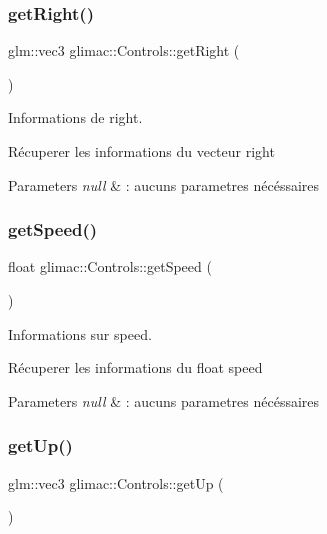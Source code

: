 \subsubsection{\texorpdfstring{get\+Right()}{getRight()}}
{\footnotesize\ttfamily glm\+::vec3 glimac\+::\+Controls\+::get\+Right (\begin{DoxyParamCaption}{ }\end{DoxyParamCaption})}



Informations de right. 

Récuperer les informations du vecteur right


\begin{DoxyParams}{Parameters}
{\em null} & \+: aucuns parametres nécéssaires \\
\hline
\end{DoxyParams}
\mbox{\label{classglimac_1_1Controls_aac3ad087d701019eede9beb547fe7425}} 
\subsubsection{\texorpdfstring{get\+Speed()}{getSpeed()}}
{\footnotesize\ttfamily float glimac\+::\+Controls\+::get\+Speed (\begin{DoxyParamCaption}{ }\end{DoxyParamCaption})}



Informations sur speed. 

Récuperer les informations du float speed


\begin{DoxyParams}{Parameters}
{\em null} & \+: aucuns parametres nécéssaires \\
\hline
\end{DoxyParams}
\mbox{\label{classglimac_1_1Controls_a6d030431b293ace529d7696c2444fd68}} 
\subsubsection{\texorpdfstring{get\+Up()}{getUp()}}
{\footnotesize\ttfamily glm\+::vec3 glimac\+::\+Controls\+::get\+Up (\begin{DoxyParamCaption}{ }\end{DoxyParamCaption})}



